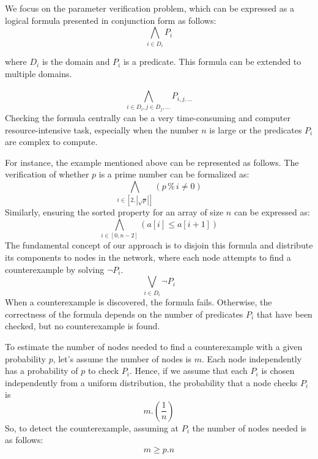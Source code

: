 \documentclass[runningheads]{llncs}
\begin{document}
We focus on the parameter verification problem, which can be expressed as a logical formula presented in conjunction form as follows:
\begin{displaymath}
\bigwedge_{i \in D_i} P_{i}
\end{displaymath}

where $D_i$  is the domain and $P_i$  is a predicate. This formula can be extended to multiple domains.

\begin{displaymath}
\bigwedge_{i \in D_i, j \in D_j, \dots}^{} P_{i, j, \dots}
\end{displaymath}
Checking the formula centrally can be a very time-consuming and computer resource-intensive task, especially when the number $n$ is large or the predicates $P_i$ are complex to compute. 

For instance, the example mentioned above can be represented as follows. The verification of whether $p$ is a prime number can be formalized as:
\begin{displaymath}
 \bigwedge_{i \in [2, |\sqrt p|]} (p \mathbin{\%} i \neq 0)
\end{displaymath}
Similarly, ensuring the sorted property for an array of size $n$ can be expressed as:
\begin{displaymath}
\bigwedge_{i \in [0, n - 2]} (a[i] \le a[i+1])
\end{displaymath}
The fundamental concept of our approach is to disjoin this formula and distribute its components to nodes in the network, where each node attempts to find a counterexample by solving $\neg P_{i}$. 
\begin{displaymath}
\bigvee_{i \in D_i} \neg P_{i}
\end{displaymath}
When a counterexample is discovered, the formula fails. Otherwise, the correctness of the formula depends on the number of predicates  $P_{i}$ that have been checked, but no counterexample is found. 

To estimate the number of nodes needed to find a counterexample with a given probability $p$, let's assume the number of nodes is $m$. Each node independently has a probability of $p$ to check $P_{i}$. Hence, if we assume that each $P_{i}$ is chosen independently from a uniform distribution, the probability that a node checks $P_{i}$ is 
\begin{displaymath}
 m. (\frac{1}{n})
\end{displaymath}
So, to detect the counterexample, assuming at $P_{i}$ the number of nodes needed is as follows:
\begin{displaymath}
 m \ge p.n
\end{displaymath}
\end{document}

